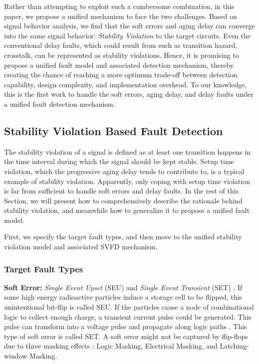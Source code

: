 Rather than attempting to exploit such a cumbersome combination, in this paper, we propose a unified mechanism to face the two challenges. Based on signal behavior analysis, we find that the soft errors and aging delay can converge into the same signal behavior: \emph{Stability Violation} to the target circuits. Even the conventional delay faults, which could result from such as transition hazard, crosstalk, can be represented as stability violations. Hence, it is promising to propose a unified fault model and associated detection mechanism, thereby creating the chance of reaching a more optimum trade-off between detection capability, design complexity, and implementation overhead. To our knowledge, this is the first work to handle the soft errors, aging delay, and delay faults under a unified fault detection mechanism.

\subsection{Stability Violation Based Fault Detection}

The stability violation of a signal is defined as at least one transition happens in the time interval during which the signal should be kept stable. Setup time violation, which the progressive aging delay tends to contribute to, is a typical example of stability violation. Apparently, only coping with setup time violation is far from sufficient to handle soft errors and delay faults. In the rest of this Section, we will present how to comprehensively describe the rationale behind stability violation, and meanwhile how to generalize it to propose a unified fault model.

First, we specify the target fault types, and then move to the unified stability violation model and associated SVFD mechanism.

\subsubsection{Target Fault Types}
{\bf Soft Error:} \emph{Single Event Upset} (SEU) and \emph{Single Event Transient} (SET) \cite{Nicolaidis_TDMR05}. If some high energy radioactive particles induce a storage cell to be flipped, this unintentional bit-flip is called SEU. If the particles cause a node of combinational logic to collect enough charge, a transient current pulse could be generated. This pulse can transform into a voltage pulse and propagate along logic paths  \cite{Shivakumar_DSN02}. This type of soft error is called SET. A soft error might not be captured by flip-flops due to three masking effects \cite{Shivakumar_DSN02}: Logic Masking, Electrical Masking, and Latching-window Masking.

